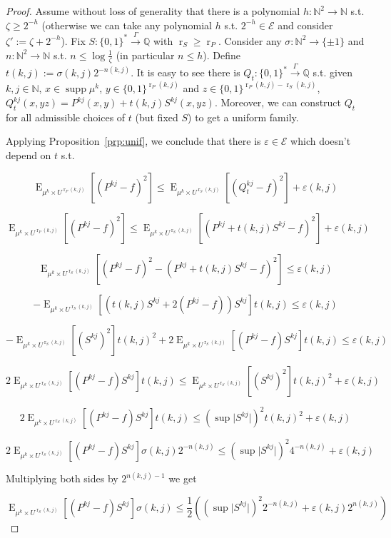 \documentclass{article}
\theoremstyle{definition}
\theoremstyle{plain}
\newcommand{\Words}{{\{ 0, 1 \}^*}}
\newcommand{\WordsLen}[1]{{\{ 0, 1 \}^{#1}}}
\DeclareMathOperator{\Supp}{supp}
\DeclareMathOperator{\E}{E}
\DeclareMathOperator{\R}{r}
\newcommand{\Nats}{\mathbb{N}}
\newcommand{\Rats}{\mathbb{Q}}
\newcommand{\Abs}[1]{\lvert #1 \rvert}
\begin{document}
\begin{proof}

Assume without loss of generality that there is a polynomial ${h: \Nats^2 \rightarrow \Nats}$ s.t. $\zeta \geq 2^{-h}$ (otherwise we can take any polynomial $h$ s.t. $2^{-h} \in \mathcal{E}$ and consider $\zeta':=\zeta+2^{-h}$). Fix $S: \Words \xrightarrow{\Gamma} \Rats$ with $\R_S \geq \R_P$. Consider any ${\sigma: \Nats^2 \rightarrow \{ \pm 1 \}}$ and $n: \Nats^2 \rightarrow \Nats$ s.t. $n \leq \log \frac{1}{\zeta}$ (in particular $n \leq h$). Define ${t(k,j) := \sigma(k,j) 2^{-n(k,j)}}$. It is easy to see there is $Q_t: \Words \xrightarrow{\Gamma} \Rats$ s.t. given $k,j \in \Nats$, $x \in \Supp \mu^k$, ${y \in \WordsLen{\R_P(k,j)}}$ and $z \in \WordsLen{\R_P(k,j) - \R_S(k,j)}$, $Q_t^{kj}(x,yz) = P^{kj}(x,y) + t(k,j) S^{kj}(x,yz)$. Moreover, we can construct $Q_t$ for all admissible choices of $t$ (but fixed $S$) to get a uniform family.

Applying Proposition~\ref{prp:unif}, we conclude that there is $\varepsilon \in \mathcal{E}$ which doesn't depend on $t$ s.t.

$$\E_{\mu^k \times U^{\R_P(k,j)}}[(P^{kj} - f)^2] \leq \E_{\mu^k \times U^{\R_S(k,j)}}[(Q_t^{kj} - f)^2] + \varepsilon(k,j)$$

$$\E_{\mu^k \times U^{\R_P(k,j)}}[(P^{kj} - f)^2] \leq \E_{\mu^k \times U^{\R_S(k,j)}}[(P^{kj} + t(k,j)S^{kj}  - f)^2] + \varepsilon(k,j)$$

$$\E_{\mu^k \times U^{\R_S(k,j)}}[(P^{kj} - f)^2 - (P^{kj} + t(k,j)S^{kj} - f)^2] \leq \varepsilon(k,j)$$

$$-\E_{\mu^k \times U^{\R_S(k,j)}}[(t(k,j)S^{kj} + 2 (P^{kj} - f)) S^{kj}] t(k,j) \leq \varepsilon(k,j)$$

$$-\E_{\mu^k \times U^{\R_S(k,j)}}[(S^{kj})^2] t(k,j)^2 + 2 \E_{\mu^k \times U^{\R_S(k,j)}}[(P^{kj} - f) S^{kj}] t(k,j) \leq \varepsilon(k,j)$$

$$2 \E_{\mu^k \times U^{\R_S(k,j)}}[(P^{kj} - f) S^{kj}] t(k,j) \leq \E_{\mu^k \times U^{\R_S(k,j)}}[(S^{kj})^2] t(k,j)^2 + \varepsilon(k,j)$$

$$2 \E_{\mu^k \times U^{\R_S(k,j)}}[(P^{kj} - f) S^{kj}] t(k,j) \leq (\sup \Abs{S^{kj}})^2 t(k,j)^2 + \varepsilon(k,j)$$

$$2 \E_{\mu^k \times U^{\R_S(k,j)}}[(P^{kj} - f) S^{kj}] \sigma(k,j) 2^{-n(k,j)} \leq (\sup \Abs{S^{kj}})^2 4^{-n(k,j)} + \varepsilon(k,j)$$

Multiplying both sides by $2^{n(k,j)-1}$ we get

$$\E_{\mu^k \times U^{\R_S(k,j)}}[(P^{kj} - f) S^{kj}] \sigma(k,j) \leq \frac{1}{2}((\sup \Abs{S^{kj}})^2 2^{-n(k,j)} + \varepsilon(k,j) 2^{n(k,j)})$$


\end{proof}
\end{document}

